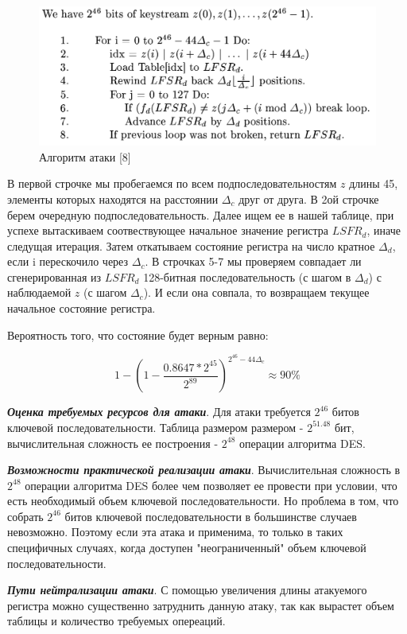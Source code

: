 \documentclass[colorthm]{./civarticle}
\begin{document}
\begin{figure}[H]
    \centering
    \includegraphics[width=0.5\linewidth]{Снимок.PNG}
    \caption{Алгоритм атаки [8]}
    \label{fig:enter-label}
\end{figure}

В первой строчке мы пробегаемся по всем подпоследовательностям $z$ длины 45, элементы которых находятся на расстоянии $\Delta_c$ друг от друга. В 2ой строчке берем очередную подпоследовательность. Далее ищем ее в нашей таблице, при успехе вытаскиваем соотвествующее начальное значение регистра $LSFR_d$, иначе следущая итерация. Затем откатываем состояние регистра на число кратное $\Delta_d$, если i перескочило через $\Delta_c$. В строчках 5-7 мы проверяем совпадает ли сгенерированная из $LSFR_d$ 128-битная последовательность (с шагом в $\Delta_d$) с наблюдаемой $z$ (с шагом $\Delta_c$). И если она совпала, то возвращаем текущее начальное состояние регистра.

Вероятность того, что состояние будет верным равно:

\begin{equation}
    1-\left(1-\frac{0.8647 * 2^{45}}{2^{89}}\right)^{2^{46}-44 \Delta_c} \approx 90 \%
\end{equation}

\textbf{\emph{Оценка требуемых ресурсов для атаки}}. Для атаки требуется $2^{46}$ битов ключевой последовательности. Таблица размером размером - $2^{51.48}$ бит, вычислительная сложность ее построения - $2^{48}$ операции алгоритма DES.

\textbf{\emph{Возможности практической реализации атаки}}. Вычислительная сложность в $2^{48}$ операции алгоритма DES более чем позволяет ее провести при условии, что есть необходимый объем ключевой последовательности. Но проблема в том, что собрать $2^{46}$ битов ключевой последовательности в большинстве случаев невозможно. Поэтому если эта атака и применима, то только в таких специфичных случаях, когда доступен "неограниченный" объем ключевой последовательности.

\textbf{\emph{Пути нейтрализации атаки}}. С помощью увеличения длины атакуемого регистра можно существенно затруднить данную атаку, так как вырастет объем таблицы и количество требуемых опереаций.
\end{document}
